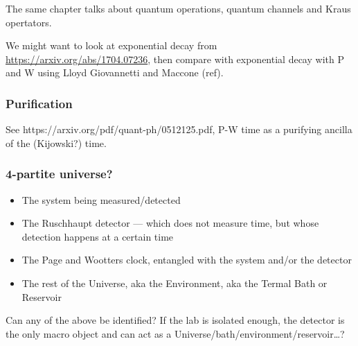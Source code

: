 The same chapter talks about quantum operations, quantum channels and Kraus opertators.

We might want to look at exponential decay from \url{https://arxiv.org/abs/1704.07236},
then compare with exponential decay with P and W using Lloyd Giovannetti and Maccone (ref).

\subsubsection{Purification}

See https://arxiv.org/pdf/quant-ph/0512125.pdf, P-W time as a purifying ancilla
of the (Kijowski?) time.

\subsubsection{4-partite universe?}
\begin{itemize}
  \item{The system being measured/detected}
  \item{The Ruschhaupt detector --- which does not measure time, but whose detection happens at a certain time}
  \item{The Page and Wootters clock, entangled with the system and/or the detector}
  \item{The rest of the Universe, aka the Environment, aka the Termal Bath or Reservoir}
\end{itemize}

Can any of the above be identified? If the lab is isolated enough,
the detector is the only macro object and can act as a Universe/bath/environment/reservoir\dots?
